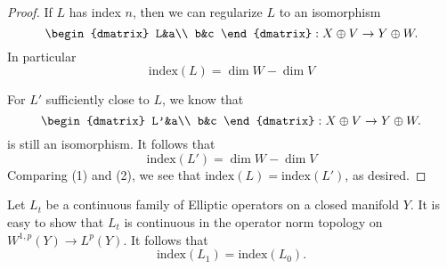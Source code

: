    \begin{proof}
     If $L$ has index $n$, then we can regularize $L$ to an isomorphism
     \begin{equation*}
       \begin{dmatrix}
         L&a\\
         b&c
       \end{dmatrix}:X\oplus V\to Y\oplus W.
     \end{equation*}
     In particular
     \begin{equation*}\tag{1}
       \text{index}(L)=\dim W-\dim V
     \end{equation*}
     
     For $L'$ sufficiently close to $L$, we know that
     \begin{equation*}
       \begin{dmatrix}
         L'&a\\
         b&c
       \end{dmatrix}:X\oplus V\to Y\oplus W.
     \end{equation*}
     is still an isomorphism. It follows that
     \begin{equation*}\tag{2}
       \text{index}(L')=\dim W-\dim V
     \end{equation*}
     Comparing (1) and (2), we see that
     $\text{index}(L)=\text{index}(L')$, as desired.
   \end{proof}
   \begin{cor}
     Let $L_{t}$ be a continuous family of Elliptic operators on a
     closed manifold $Y$. It is easy to show that $L_{t}$ is
     continuous in the operator norm topology on $W^{1,p}(Y)\to
     L^{p}(Y)$. It follows that
     \begin{equation*}
       \text{index}(L_{1})=\text{index}(L_{0}).
     \end{equation*}
   \end{cor}